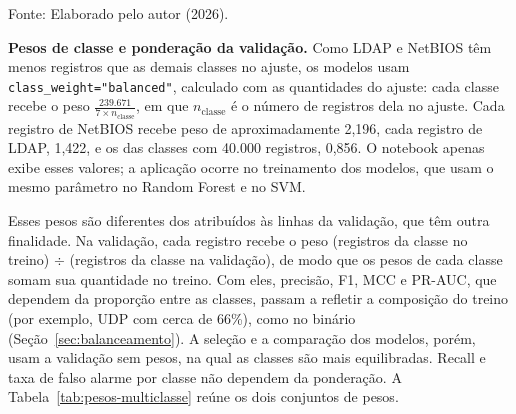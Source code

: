 \documentclass[
    12pt,                %
    openright,           %
    oneside,             %
    a4paper,             %
    english,             %
    brazil               %
]{abntex2}
\begin{document}
\begin{table}
\centering
\caption{Distribuição dos registros por classe no balanceamento multiclasse}
\label{tab:balanceamento-multiclasse}
\par\smallskip
Fonte: Elaborado pelo autor (2026).
\end{table}
 
\textbf{Pesos de classe e ponderação da validação.} Como LDAP e NetBIOS têm menos registros que as demais classes no ajuste, os modelos usam \texttt{class\_weight="balanced"}, calculado com as quantidades do ajuste: cada classe recebe o peso $\frac{239.671}{7 \times n_{\text{classe}}}$, em que $n_{\text{classe}}$ é o número de registros dela no ajuste. Cada registro de NetBIOS recebe peso de aproximadamente 2,196, cada registro de LDAP, 1,422, e os das classes com 40.000 registros, 0,856. O notebook apenas exibe esses valores; a aplicação ocorre no treinamento dos modelos, que usam o mesmo parâmetro no Random Forest e no SVM.
 
Esses pesos são diferentes dos atribuídos às linhas da validação, que têm outra finalidade. Na validação, cada registro recebe o peso (registros da classe no treino) $\div$ (registros da classe na validação), de modo que os pesos de cada classe somam sua quantidade no treino. Com eles, precisão, F1, MCC e PR-AUC, que dependem da proporção entre as classes, passam a refletir a composição do treino (por exemplo, UDP com cerca de 66\%), como no binário (Seção~\ref{sec:balanceamento}). A seleção e a comparação dos modelos, porém, usam a validação sem pesos, na qual as classes são mais equilibradas. Recall e taxa de falso alarme por classe não dependem da ponderação. A Tabela~\ref{tab:pesos-multiclasse} reúne os dois conjuntos de pesos.
 
\end{document}
